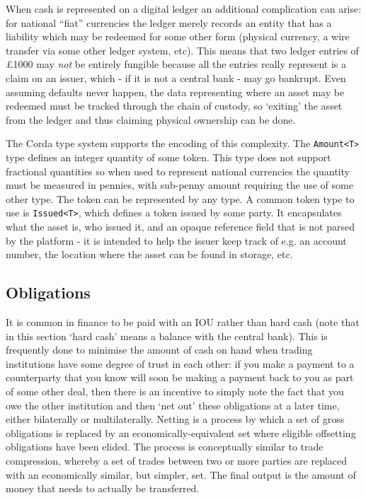 \documentclass{article}
\begin{document}
When cash is represented on a digital ledger an additional complication can arise: for national ``fiat'' currencies
the ledger merely records an entity that has a liability which may be redeemed for some other form (physical currency,
a wire transfer via some other ledger system, etc). This means that two ledger entries of \pounds1000 may \emph{not}
be entirely fungible because all the entries really represent is a claim on an issuer, which - if it is not a central
bank - may go bankrupt. Even assuming defaults never happen, the data representing where an asset may be redeemed
must be tracked through the chain of custody, so `exiting' the asset from the ledger and thus claiming physical
ownership can be done.

The Corda type system supports the encoding of this complexity. The \texttt{Amount<T>} type defines an integer
quantity of some token. This type does not support fractional quantities so when used to represent national
currencies the quantity must be measured in pennies, with sub-penny amount requiring the use of some other type.
The token can be represented by any type. A common token type to use is \texttt{Issued<T>}, which defines a token
issued by some party. It encapsulates what the asset is, who issued it, and an opaque reference field that is not
parsed by the platform - it is intended to help the issuer keep track of e.g. an account number, the location where
the asset can be found in storage, etc.

\subsection{Obligations}

It is common in finance to be paid with an IOU rather than hard cash (note that in this section `hard cash' means a
balance with the central bank). This is frequently done to minimise the amount of cash on hand when trading institutions
have some degree of trust in each other: if you make a payment to a counterparty that you know will soon be making a
payment back to you as part of some other deal, then there is an incentive to simply note the fact that you owe the
other institution and then `net out' these obligations at a later time, either bilaterally or multilaterally. Netting is
a process by which a set of gross obligations is replaced by an economically-equivalent set where eligible offsetting
obligations have been elided. The process is conceptually similar to trade compression, whereby a set of trades between
two or more parties are replaced with an economically similar, but simpler, set. The final output is the amount of money
that needs to actually be transferred.
\end{document}
